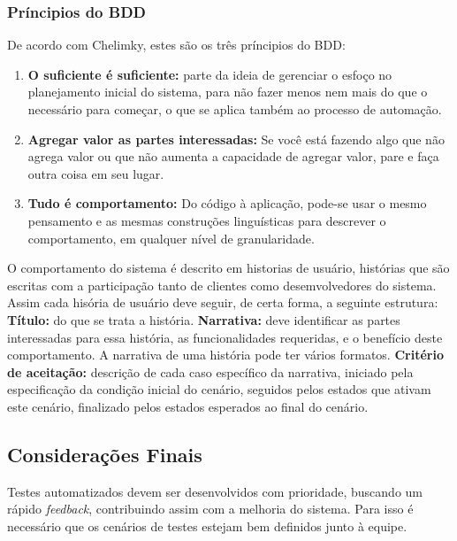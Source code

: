 \subsubsection{Príncipios do BDD}
De acordo com Chelimky, estes são os três príncipios do BDD:
\begin{enumerate}
\item \textbf{O suficiente é suficiente:} parte da ideia de gerenciar o esfoço no 
planejamento inicial do sistema, para não fazer menos nem mais do que o necessário 
para começar, o que se aplica também ao processo de automação.
\item \textbf{Agregar valor as partes interessadas:} Se você está fazendo algo que 
não agrega valor ou que não aumenta a capacidade de agregar valor, pare e faça outra 
coisa em seu lugar.
\item \textbf{Tudo é comportamento:} Do código à aplicação, pode-se usar o mesmo 
pensamento e as mesmas construções linguísticas para descrever o comportamento, em 
qualquer nível de granularidade. 
\end{enumerate}
%
O comportamento do sistema é descrito em historias de usuário, histórias que são 
escritas com a participação tanto de clientes como desemvolvedores do sistema. Assim 
cada hisória de usuário deve seguir, de certa forma, a seguinte estrutura:
%
\textbf{Título:} do que se trata a história.
%
\textbf{Narrativa:} deve identificar as partes interessadas para essa história, as 
funcionalidades requeridas, e o benefício deste comportamento. A narrativa de uma 
história pode ter vários formatos.
%
\textbf{Critério de aceitação:} descrição de cada caso específico da narrativa, 
iniciado pela especificação da condição inicial do cenário, seguidos pelos estados 
que ativam este cenário, finalizado pelos estados esperados ao final do cenário.
%

\subsection{Considerações Finais}
Testes automatizados devem ser desenvolvidos com prioridade, buscando um rápido 
\textit{feedback}, contribuindo assim com a melhoria do sistema. Para isso é 
necessário que os cenários de testes estejam bem definidos junto à equipe.
%
